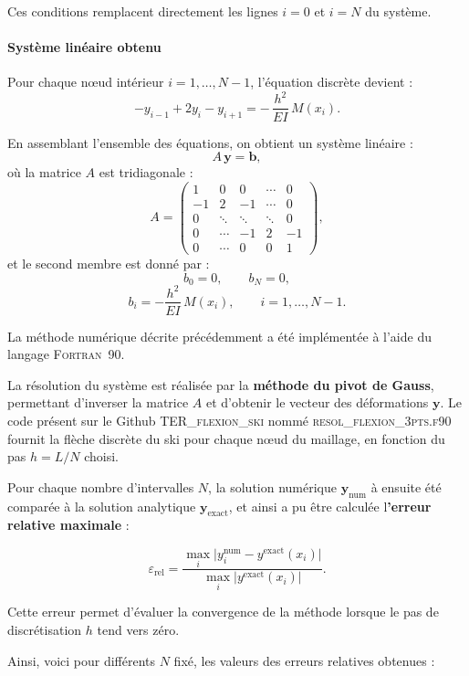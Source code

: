 \documentclass[12pt, a4paper]{article}
\begin{document}
Ces conditions remplacent directement les lignes $i=0$ et $i=N$ du système.

\paragraph{Système linéaire obtenu}

Pour chaque nœud intérieur $i=1,\dots,N-1$, l’équation discrète devient :
\[
- y_{i-1} + 2y_i - y_{i+1}
= -\,\frac{h^2}{EI}\,M(x_i).
\]

En assemblant l’ensemble des équations, on obtient un système linéaire :
\[
A\,\mathbf{y} = \mathbf{b},
\]
où la matrice $A$ est tridiagonale :
\[
A=
\begin{pmatrix}
1 & 0 & 0 & \cdots & 0\\
-1 & 2 & -1 & \cdots & 0\\
0 & \ddots & \ddots & \ddots & 0\\
0 & \cdots & -1 & 2 & -1\\
0 & \cdots & 0 & 0 & 1
\end{pmatrix},
\]
et le second membre est donné par :
\[
b_0=0,\qquad b_N=0,
\]
\[
b_i = -\frac{h^2}{EI}\,M(x_i),\qquad i=1,\dots,N-1.
\]

La méthode numérique décrite précédemment a été implémentée à l’aide du langage \textsc{Fortran}~90.  

La résolution du système est réalisée par la \textbf{méthode du pivot de Gauss}, permettant d’inverser la matrice $A$ et d’obtenir le vecteur des déformations $\mathbf{y}$.  
Le code présent sur le Github \textsc{TER\_flexion\_ski} nommé \textsc{resol\_flexion\_3pts.f90} fournit la flèche discrète du ski pour chaque nœud du maillage, en fonction du pas $h = L/N$ choisi.

Pour chaque nombre d’intervalles $N$, la solution numérique $\mathbf{y}_{\text{num}}$ à ensuite été comparée à la solution analytique $\mathbf{y}_{\text{exact}}$, et ainsi a pu être calculée l\textbf{'erreur relative maximale} :

\[
\varepsilon_{\text{rel}} = \frac{\max_i \big|y^{\text{num}}_i - y^{\text{exact}}(x_i)\big|}{\max_i \big|y^{\text{exact}}(x_i)\big|}.
\]

Cette erreur permet d’évaluer la convergence de la méthode lorsque le pas de discrétisation $h$ tend vers zéro.  

Ainsi, voici pour différents $N$ fixé, les valeurs des erreurs relatives obtenues : 
\end{document}
